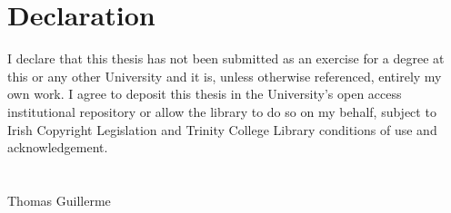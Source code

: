 \chapter*{Declaration}

I declare that this thesis has not been submitted as an exercise for a degree at this or any other University and it is, unless otherwise referenced, entirely my own work. I agree to deposit this thesis in the University's open access institutional repository or allow the library to do so on my behalf, subject to Irish Copyright Legislation and Trinity College Library conditions of use and acknowledgement.
\\
\\
\\

Thomas Guillerme